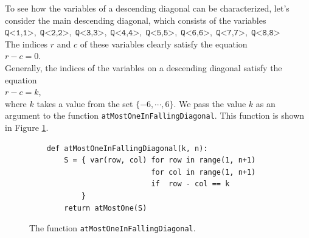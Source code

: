 To see how the variables of a descending diagonal can be characterized, let's consider the main descending diagonal, which consists of the
variables \\[0.2cm]
\hspace*{1.3cm} 
$\texttt{Q<1,1>},\; \texttt{Q<2,2>},\; \texttt{Q<3,3>},\; \texttt{Q<4,4>},\; \texttt{Q<5,5>},\; 
 \texttt{Q<6,6>},\; \texttt{Q<7,7>},\; \texttt{Q<8,8>}$ 
\\[0.2cm]
The indices $r$ and $c$ of these variables clearly satisfy
the equation \\[0.2cm]
\hspace*{1.3cm} $r - c = 0$. \\[0.2cm]
Generally, the indices of the variables on a descending diagonal satisfy the equation \\[0.2cm]
\hspace*{1.3cm} $r - c = k$, \\[0.2cm]
where $k$ takes a value from the set $\{-6, \cdots, 6 \}$. We pass the value $k$ as an argument to the
function \texttt{atMostOneInFallingDiagonal}. This function is shown in Figure
\ref{fig:atMostOneInLowerDiagonal}.

\begin{figure}[!ht]
  \centering
\begin{verbatim}
    def atMostOneInFallingDiagonal(k, n):
        S = { var(row, col) for row in range(1, n+1)
                            for col in range(1, n+1) 
                            if  row - col == k 
            }
        return atMostOne(S)
\end{verbatim}
\vspace*{-0.3cm}
  \caption{The function \texttt{atMostOneInFallingDiagonal}.}
  \label{fig:atMostOneInLowerDiagonal}
\end{figure}

